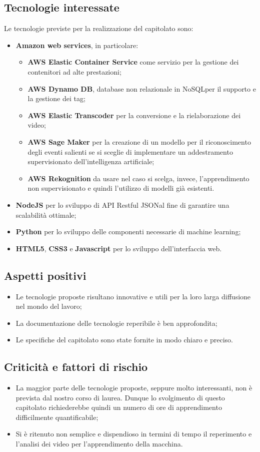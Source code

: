 \subsection{Tecnologie interessate}
Le tecnologie previste per la realizzazione del capitolato sono:
\begin{itemize}
	\item \textbf{Amazon web services\glo}, in particolare:
	\begin{itemize}
		\item \textbf{AWS Elastic Container Service\glo} come servizio per la gestione dei contenitori ad alte prestazioni;
		\item \textbf{AWS Dynamo DB\glo}, database non relazionale in NoSQL\glosp per il supporto e la gestione dei tag;
		\item \textbf{AWS Elastic Transcoder\glo} per la conversione e la rielaborazione dei video;
		\item \textbf{AWS Sage Maker\glo} per la creazione di un modello per il riconoscimento degli eventi salienti se si sceglie di implementare un addestramento supervisionato dell'intelligenza artificiale;
		\item \textbf{AWS Rekognition\glo} da usare nel caso si scelga, invece, l'apprendimento non supervisionato e quindi l'utilizzo di modelli già esistenti.
	\end{itemize}
	\item \textbf{NodeJS\glo} per lo sviluppo di API Restful JSON\glosp al fine di garantire una scalabilità ottimale;
	\item \textbf{Python\glo} per lo sviluppo delle componenti necessarie di machine learning;
	\item \textbf{HTML5\glo}, \textbf{CSS3\glo} e \textbf{Javascript\glo} per lo sviluppo dell'interfaccia web. 
\end{itemize}
\subsection{Aspetti positivi}
\begin{itemize}
	\item Le tecnologie proposte risultano innovative e utili per la loro larga diffusione nel mondo del lavoro;
	\item La documentazione delle tecnologie reperibile è ben approfondita;
	\item Le specifiche del capitolato sono state fornite in modo chiaro e preciso. 
\end{itemize}
\subsection{Criticità e fattori di rischio}
\begin{itemize}
	\item La maggior parte delle tecnologie proposte, seppure molto interessanti, non è prevista dal nostro corso di laurea. Dunque lo svolgimento di questo capitolato richiederebbe quindi un numero di ore di apprendimento difficilmente quantificabile;
	\item Si è ritenuto non semplice e dispendioso in termini di tempo il reperimento e l'analisi dei video per l'apprendimento della macchina.
\end{itemize}
